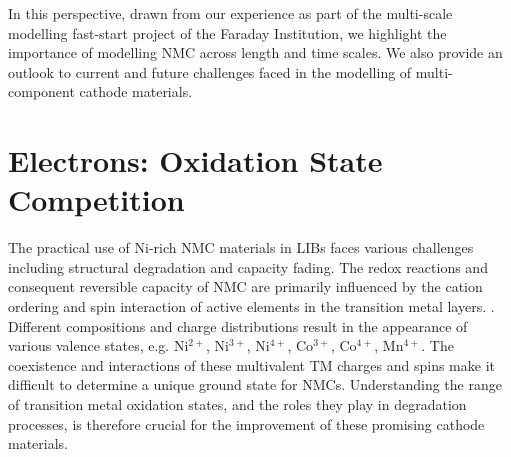 \documentclass[aps,prb,twocolumn,superscriptaddress,reprint]{revtex4-1}
\begin{document}
In this perspective, drawn from our experience as part of the multi-scale modelling fast-start project of the Faraday Institution, we highlight the importance of modelling NMC across length and time scales. We also provide an outlook to current and future challenges faced in the modelling of multi-component cathode materials.



\section*{Electrons: Oxidation State Competition}
The practical use of Ni-rich NMC materials in LIBs faces various challenges including structural degradation and capacity fading.  
The redox reactions and consequent reversible capacity of NMC are primarily influenced by the cation ordering and spin interaction of active elements in the transition metal layers. \cite{Li-acsami-2020,Maleki-aenm.2019,Feng-2019, Xia2018, Xiao_NanoEner2018}. 
Different compositions and charge distributions result in the appearance of various valence states, e.g. Ni$^{2+}$, Ni$^{3+}$, Ni$^{4+}$, Co$^{3+}$, Co$^{4+}$, Mn$^{4+}$. \cite{Xiao_NanoEner2018} 
The coexistence and interactions of these multivalent TM charges and spins make it difficult to determine a unique ground state for NMCs. \cite{Xiao_NanoEner2018}
Understanding the range of transition metal oxidation states, and the roles they play in degradation processes, is therefore crucial for the improvement of these promising cathode materials.
\end{document}
